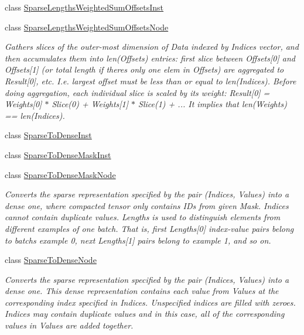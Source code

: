 \begin{DoxyCompactItemize}
class \hyperlink{classglow_1_1_sparse_lengths_weighted_sum_offsets_inst}{Sparse\+Lengths\+Weighted\+Sum\+Offsets\+Inst}
\item 
class \hyperlink{classglow_1_1_sparse_lengths_weighted_sum_offsets_node}{Sparse\+Lengths\+Weighted\+Sum\+Offsets\+Node}
\begin{DoxyCompactList}\small\item\em Gathers slices of the outer-\/most dimension of Data indexed by Indices vector, and then accumulates them into len(\+Offsets) entries\+: first slice between Offsets\mbox{[}0\mbox{]} and Offsets\mbox{[}1\mbox{]} (or total length if there\textquotesingle{}s only one elem in Offsets) are aggregated to Result\mbox{[}0\mbox{]}, etc. I.\+e. largest offset must be less than or equal to len(\+Indices). Before doing aggregation, each individual slice is scaled by its weight\+: Result\mbox{[}0\mbox{]} = Weights\mbox{[}0\mbox{]} $\ast$ Slice(0) + Weights\mbox{[}1\mbox{]} $\ast$ Slice(1) + ... It implies that len(\+Weights) == len(\+Indices). \end{DoxyCompactList}\item 
class \hyperlink{classglow_1_1_sparse_to_dense_inst}{Sparse\+To\+Dense\+Inst}
\item 
class \hyperlink{classglow_1_1_sparse_to_dense_mask_inst}{Sparse\+To\+Dense\+Mask\+Inst}
\item 
class \hyperlink{classglow_1_1_sparse_to_dense_mask_node}{Sparse\+To\+Dense\+Mask\+Node}
\begin{DoxyCompactList}\small\item\em Converts the sparse representation specified by the pair (Indices, Values) into a dense one, where compacted tensor only contains I\+Ds from given Mask. Indices cannot contain duplicate values. Lengths is used to distinguish elements from different examples of one batch. That is, first Lengths\mbox{[}0\mbox{]} index-\/value pairs belong to batch\textquotesingle{}s example 0, next Lengths\mbox{[}1\mbox{]} pairs belong to example 1, and so on. \end{DoxyCompactList}\item 
class \hyperlink{classglow_1_1_sparse_to_dense_node}{Sparse\+To\+Dense\+Node}
\begin{DoxyCompactList}\small\item\em Converts the sparse representation specified by the pair (Indices, Values) into a dense one. This dense representation contains each value from Values at the corresponding index specified in Indices. Unspecified indices are filled with zeroes. Indices may contain duplicate values and in this case, all of the corresponding values in Values are added together. \end{DoxyCompactList}\item 

\end{DoxyCompactItemize}
